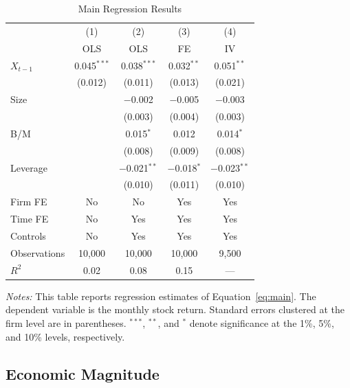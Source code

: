 \documentclass[12pt,a4paper]{article}
\begin{document}
\begin{table}[H]
\centering
\caption{Main Regression Results}
\label{tab:regression}
\begin{threeparttable}
\begin{tabular}{lcccc}
\toprule
 & (1) & (2) & (3) & (4) \\
 & OLS & OLS & FE & IV \\
\midrule
$X_{t-1}$ & 0.045$^{***}$ & 0.038$^{***}$ & 0.032$^{**}$ & 0.051$^{**}$ \\
           & (0.012)       & (0.011)       & (0.013)      & (0.021) \\[6pt]
Size       &               & $-$0.002      & $-$0.005     & $-$0.003 \\
           &               & (0.003)       & (0.004)      & (0.003) \\[6pt]
B/M        &               & 0.015$^{*}$   & 0.012        & 0.014$^{*}$ \\
           &               & (0.008)       & (0.009)      & (0.008) \\[6pt]
Leverage   &               & $-$0.021$^{**}$ & $-$0.018$^{*}$ & $-$0.023$^{**}$ \\
           &               & (0.010)         & (0.011)        & (0.010) \\[6pt]
\midrule
Firm FE        & No  & No  & Yes & Yes \\
Time FE        & No  & Yes & Yes & Yes \\
Controls       & No  & Yes & Yes & Yes \\
Observations   & 10{,}000 & 10{,}000 & 10{,}000 & 9{,}500 \\
$R^2$          & 0.02 & 0.08 & 0.15 & --- \\
\bottomrule
\end{tabular}
\begin{tablenotes}
\small
\item \textit{Notes:} This table reports regression estimates of Equation~\eqref{eq:main}. The dependent variable is the monthly stock return. Standard errors clustered at the firm level are in parentheses. $^{***}$, $^{**}$, and $^{*}$ denote significance at the 1\%, 5\%, and 10\% levels, respectively.
\end{tablenotes}
\end{threeparttable}
\end{table}

\subsection{Economic Magnitude}
\end{document}
